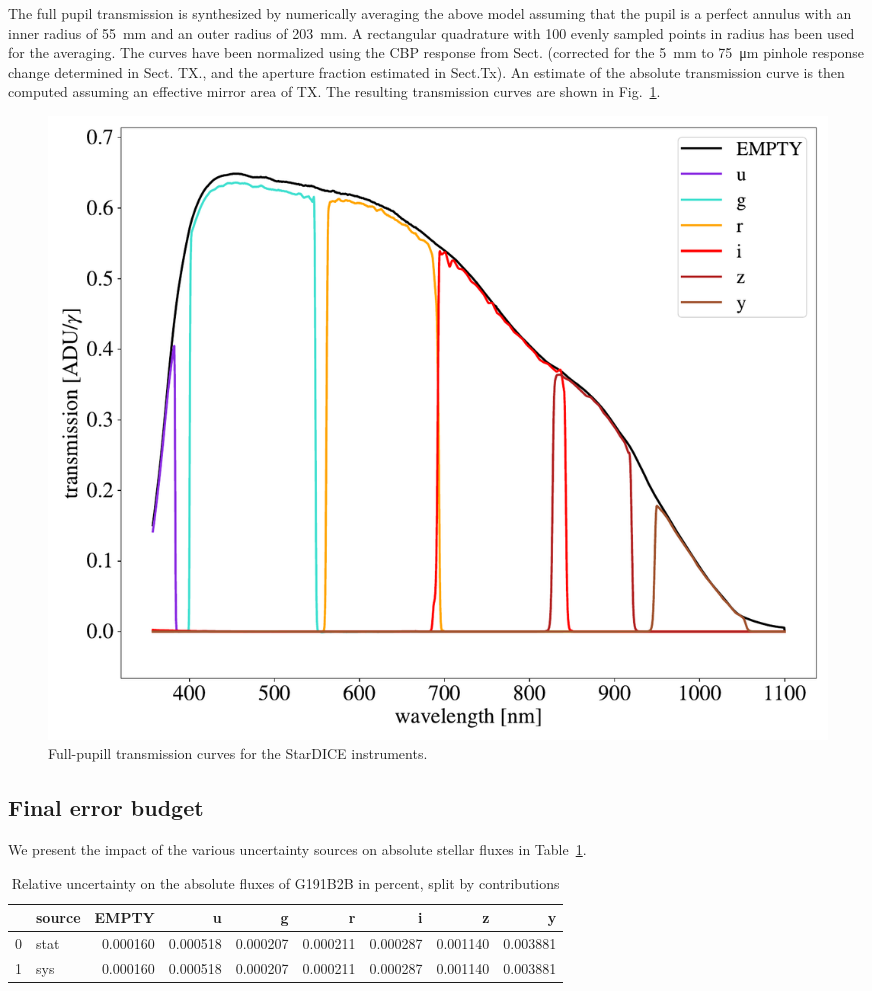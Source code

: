The full pupil transmission is synthesized by numerically averaging
the above model assuming that the pupil is a perfect annulus with an
inner radius of \SI{55}{mm} and an outer radius of \SI{203}{mm}. A
rectangular quadrature with 100 evenly sampled points in radius has
been used for the averaging. The curves have been normalized using the
CBP response from Sect. (corrected for the \SI{5}{mm} to
\SI{75}{\micro\meter} pinhole response change determined in Sect. TX.,
and the aperture fraction estimated in Sect.Tx).  An estimate of the
absolute transmission curve is then computed assuming an effective
mirror area of TX. The resulting transmission curves are shown in
Fig.~\ref{fig:fullpupiltrans}.
\begin{figure}
  \centering
  \includegraphics[width=1\linewidth]{fig/fullpupill.pdf}
  \caption{Full-pupill transmission curves for the StarDICE instruments.}
  \label{fig:fullpupiltrans}
\end{figure}



\subsection{Final error budget}

We present the impact of the various uncertainty sources on absolute
stellar fluxes in Table~\ref{tab:budget}.
\begin{table}
  \centering
  \caption{Relative uncertainty on the absolute fluxes of G191B2B in percent, split by contributions}
  \label{tab:budget}
  \begin{tabular}{llrrrrrrr}
    \toprule
    & source & EMPTY & u & g & r & i & z & y \\
    \midrule
    0 & stat & 0.000160 & 0.000518 & 0.000207 & 0.000211 & 0.000287 & 0.001140 & 0.003881 \\
    1 & sys & 0.000160 & 0.000518 & 0.000207 & 0.000211 & 0.000287 & 0.001140 & 0.003881 \\
    \bottomrule
\end{tabular}
\end{table}